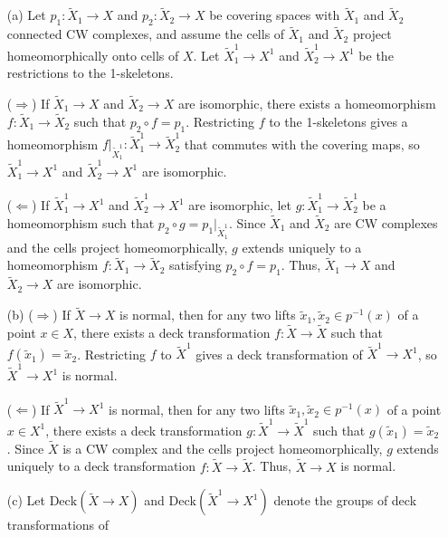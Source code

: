 \documentclass[12pt]{article}
\begin{document}
\begin{newproof}
  \begin{itemize}
    \item[(a)] Let $p_1: \tilde{X}_1 \to X$ and $p_2: \tilde{X}_2 \to X$ be covering spaces with $\tilde{X}_1$ and $\tilde{X}_2$ 
      connected CW complexes, and assume the cells of $\tilde{X}_1$ and $\tilde{X}_2$ project 
      homeomorphically onto cells of $X$. Let $\tilde{X}^1_1 \to X^1$ and $\tilde{X}^1_2 \to X^1$ be the 
      restrictions to the 1-skeletons.
      \par ($\Rightarrow$) If $\tilde{X}_1 \to X$ and $\tilde{X}_2 \to X$ are isomorphic, there exists a 
      homeomorphism $f: \tilde{X}_1 \to \tilde{X}_2$ such that $p_2 \circ f = p_1$. Restricting $f$ to the 
      1-skeletons gives a homeomorphism $f|_{\tilde{X}^1_1}: \tilde{X}^1_1 \to \tilde{X}^1_2$ that commutes 
      with the covering maps, so $\tilde{X}^1_1 \to X^1$ and $\tilde{X}^1_2 \to X^1$ are isomorphic.
      \par ($\Leftarrow$) If $\tilde{X}^1_1 \to X^1$ and $\tilde{X}^1_2 \to X^1$ are isomorphic, let $g: 
      \tilde{X}^1_1 \to \tilde{X}^1_2$ be a homeomorphism such that $p_2 \circ g = p_1|_{\tilde{X}^1_1}$. 
      Since $\tilde{X}_1$ and $\tilde{X}_2$ are CW complexes and the cells project homeomorphically, $g$ 
      extends uniquely to a homeomorphism $f: \tilde{X}_1 \to \tilde{X}_2$ satisfying $p_2 \circ f = p_1$. 
      Thus, $\tilde{X}_1 \to X$ and $\tilde{X}_2 \to X$ are isomorphic.
    \item[(b)] ($\Rightarrow$) If $\tilde{X} \to X$ is normal, then for any two lifts $\tilde{x}_1, \tilde{x}_2 \in p^{-1}(x)$ of a point 
      $x \in X$, there exists a deck transformation $f: \tilde{X} \to \tilde{X}$ such that $f(\tilde{x}_1) = 
      \tilde{x}_2$. Restricting $f$ to $\tilde{X}^1$ gives a deck transformation of $\tilde{X}^1 \to X^1$, so 
      $\tilde{X}^1 \to X^1$ is normal.
      \par ($\Leftarrow$) If $\tilde{X}^1 \to X^1$ is normal, then for any two lifts $\tilde{x}_1, \tilde{x}_2 
      \in p^{-1}(x)$ of a point $x \in X^1$, there exists a deck transformation $g: \tilde{X}^1 \to 
      \tilde{X}^1$ such that $g(\tilde{x}_1) = \tilde{x}_2$. Since $\tilde{X}$ is a CW complex and the cells 
      project homeomorphically, $g$ extends uniquely to a deck transformation $f: \tilde{X} \to \tilde{X}$. 
      Thus, $\tilde{X} \to X$ is normal.
    \item[(c)] Let $\text{Deck}(\tilde{X} \to X)$ and $\text{Deck}(\tilde{X}^1 \to X^1)$ denote the groups of deck transformations of 

\end{itemize}
\end{newproof}
\end{document}
